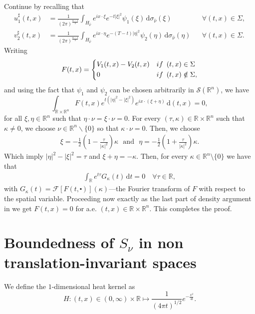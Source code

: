 \documentclass[10pt,a4paper]{amsart}
\newcommand{\R}{\mathbb{R}}
\newcommand{\dd}{\mathrm{d}}
\begin{document}
Continue by recalling that
\begin{align*}
u_1^\sharp (t, x) & = \frac{1}{(2\pi)^\frac{n-1}{2}} \int_{H_{\hat{\nu}}} e^{ix \cdot \xi} e^{- t |\xi|^2} {\psi_1}(\xi) \, \dd \sigma_{\hat{\nu}} (\xi) & & \forall(t, x) \in \Sigma, \\
v_2^\sharp (t, x) & = \frac{1}{(2\pi)^\frac{n-1}{2}} \int_{H_{\hat{\nu}}} e^{i x \cdot \eta} e^{-(T-t)|\eta|^2} {\psi_2}(\eta) \, \dd \sigma_{\hat{\nu}} (\eta) & & \forall(t, x) \in \Sigma.
\end{align*}
Writing
\begin{equation*}
	F (t, x) = \left\{
		\begin{aligned}
		& V_1 (t, x) - V_2 (t, x) &  & \textnormal{if} \enspace (t, x) \in \Sigma \\
		& 0 &  & \textnormal{if} \enspace (t, x) \notin \Sigma,
		\end{aligned}
	\right.
\end{equation*}
and using the fact that 
$\psi_1$ and $\psi_2$ can be chosen arbitrarily in $\mathcal{S}(\R^n)$, we have
$$
\int_{\mathbb{R} \times \mathbb{R}^n} F(t, x) e^{t(|\eta|^2-|\xi|^2)}   {e^{i x \cdot (\xi+\eta)} } \, \dd (t,x) = 0,
$$
for all $\xi, \eta\in \R^n$ such that $\eta \cdot \nu = \xi \cdot \nu=0$.
For every $(\tau, \kappa) \in \mathbb{R} \times \mathbb{R}^n$ such that $\kappa \neq 0$, we 
choose $\nu \in \mathbb{R}^n \backslash\{0\}$ so that $\kappa \cdot \nu=0$. Then, we choose
\begin{align*}
   \xi=- \frac{1}{2}(1-\frac{\tau}{|\kappa|^2})\kappa   ~~~\text{and}~~~ \eta= -\frac{1}{2}(1+\frac{\tau}{|\kappa|^2})\kappa.
\end{align*}
Which imply $|\eta|^2-|\xi|^2=\tau$ and $\xi+\eta=- \kappa$. Then, for every $\kappa \in \R^n \setminus \{ 0 \}$ we have that
\begin{align*}
\int_\R e^{t\tau} G_\kappa (t) \,\dd t = 0 \quad \forall \tau \in \R,
\end{align*}
with $ G_\kappa (t) = \mathcal{F}[F(t, \centerdot)](\kappa) $---the Fourier transform of $F$
with respect to the spatial variable.
Proceeding now exactly as the last part of density argument in
 we get $F(t, x)=0$ for a.e. $(t, x) \in \mathbb{R} \times \mathbb{R}^n$.
This completes the proof.


\section{Boundedness of \texorpdfstring{$S_\nu$}{Snu} in non translation-invariant spaces}
\label{sec:boundedness}
We define the $1$-dimensional heat kernel as
\begin{equation}
\label{id:1d_heat_kernel}
H: (t, x) \in (0,\infty) \times \R \longmapsto \frac{1}{(4\pi t)^{1/2}} e^{-\frac{x^2}{4t}}.
\end{equation}
\end{document}

